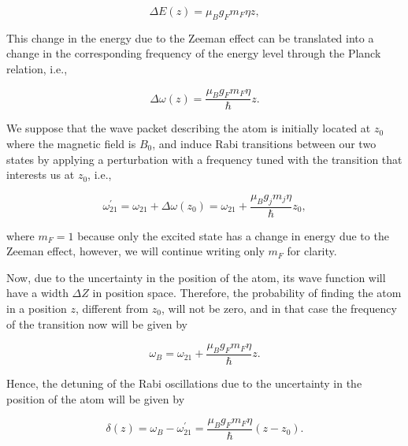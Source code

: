 \documentclass{article}
\begin{document}
\begin{equation}
  \Delta E(z) = \mu_{B} g_{F} m_{F} \eta z,
\end{equation}

This change in the energy due to the Zeeman effect can be translated into a change in the corresponding frequency of the energy level through the Planck relation, i.e.,

\begin{equation}
  \Delta \omega(z) = \frac{\mu_{B} g_{F} m_{F} \eta}{\hbar} z.
\end{equation}

We suppose that the wave packet describing the atom is initially located at $z_{0}$ where the magnetic field is $B_{0}$, and induce Rabi transitions between our two states by applying a perturbation with a frequency tuned with the transition that interests us at $z_{0}$, i.e., 

\begin{equation}
  \omega_{21}^{\prime} = \omega_{21} + \Delta \omega(z_{0}) =  \omega_{21} + \frac{\mu_{B} g_{j} m_{j} \eta}{\hbar} z_{0},
\end{equation}

where $m_{F} = 1$ because only the excited state has a change in energy due to the Zeeman effect, however, we will continue writing only $m_{F}$ for clarity.

Now, due to the uncertainty in the position of the atom, its wave function will have a width $\Delta Z$ in position space. Therefore, the probability of finding the atom in a position $z$, different from $z_{0}$, will not be zero, and in that case the frequency of the transition now will be given by

\begin{equation}
  \omega_{B} =  \omega_{21} + \frac{\mu_{B} g_{F} m_{F} \eta}{\hbar} z.
\end{equation}

Hence, the detuning of the Rabi oscillations due to the uncertainty in the position of the atom will be given by

\begin{equation}\label{detunig_atom_width}
  \delta (z) = \omega_{B} - \omega_{21}^{\prime} = \frac{\mu_{B} g_{F} m_{F} \eta}{\hbar} (z-z_{0}).
\end{equation}
\end{document}
